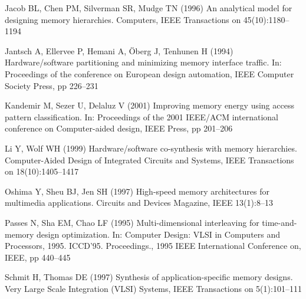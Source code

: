 \documentclass[smallcondensed]{svjour3}
\begin{document}
\begin{thebibliography}{40}
Jacob BL, Chen PM, Silverman SR, Mudge TN (1996) An analytical model for
  designing memory hierarchies. Computers, IEEE Transactions on
  45(10):1180--1194

Jantsch A, Ellervee P, Hemani A, {\"O}berg J, Tenhunen H (1994)
  Hardware/software partitioning and minimizing memory interface traffic. In:
  Proceedings of the conference on European design automation, IEEE Computer
  Society Press, pp 226--231

Kandemir M, Sezer U, Delaluz V (2001) Improving memory energy using access
  pattern classification. In: Proceedings of the 2001 IEEE/ACM international
  conference on Computer-aided design, IEEE Press, pp 201--206

Li Y, Wolf WH (1999) Hardware/software co-synthesis with memory hierarchies.
  Computer-Aided Design of Integrated Circuits and Systems, IEEE Transactions
  on 18(10):1405--1417

Oshima Y, Sheu BJ, Jen SH (1997) High-speed memory architectures for multimedia
  applications. Circuits and Devices Magazine, IEEE 13(1):8--13

Passes N, Sha EM, Chao LF (1995) Multi-dimensional interleaving for
  time-and-memory design optimization. In: Computer Design: VLSI in Computers
  and Processors, 1995. ICCD'95. Proceedings., 1995 IEEE International
  Conference on, IEEE, pp 440--445

Schmit H, Thomas DE (1997) Synthesis of application-specific memory designs.
  Very Large Scale Integration (VLSI) Systems, IEEE Transactions on
  5(1):101--111
 

\end{thebibliography}
\end{document}
